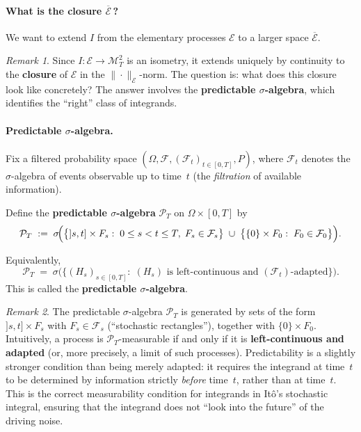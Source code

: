 \documentclass[11pt]{article}
\theoremstyle{definition}
\theoremstyle{remark}
\newtheorem{remark}{Remark}
\begin{document}
\paragraph{What is the closure $\overline{\mathcal{E}}$\,?}

We want to extend $I$ from the elementary processes $\mathcal{E}$ to a larger space $\overline{\mathcal{E}}$.

\begin{remark}
Since $I \colon \mathcal{E} \to \mathcal{M}_T^2$ is an isometry, it extends uniquely by continuity to the \textbf{closure} of $\mathcal{E}$ in the $\|\cdot\|_{\mathcal{E}}$-norm.
The question is: what does this closure look like concretely?
The answer involves the \textbf{predictable $\sigma$-algebra}, which identifies the ``right'' class of integrands.
\end{remark}

\paragraph{Predictable $\sigma$-algebra.}

Fix a filtered probability space $(\Omega,\mathcal{F},(\mathcal{F}_t)_{t\in[0,T]},P)$, where
$\mathcal{F}_t$ denotes the $\sigma$-algebra of events observable up to time~$t$
(the \emph{filtration} of available information).

Define the \textbf{predictable $\sigma$-algebra} $\mathcal{P}_T$ on $\Omega \times [0,T]$ by
\[
    \mathcal{P}_T
    \;:=\;
    \sigma\!\Bigl(
        \bigl\{]s,t] \times F_s :\;
        0 \le s < t \le T,\;
        F_s \in \mathcal{F}_s
        \bigr\}
        \;\cup\;
        \bigl\{
        \{0\} \times F_0 :\;
        F_0 \in \mathcal{F}_0
        \bigr\}
    \Bigr).
\]

Equivalently,
\[
    \mathcal{P}_T
    \;=\;
    \sigma\!\bigl(
        \{(H_s)_{s \in [0,T]} :\;
        (H_s) \text{ is left-continuous and }
        (\mathcal{F}_t)\text{-adapted}
        \}
    \bigr).
\]
This is called the \textbf{predictable $\sigma$-algebra}.

\begin{remark}
The predictable $\sigma$-algebra $\mathcal{P}_T$ is generated by sets of the form $]s,t] \times F_s$ with $F_s \in \mathcal{F}_s$ (``stochastic rectangles''), together with $\{0\} \times F_0$.
Intuitively, a process is $\mathcal{P}_T$-measurable if and only if it is \textbf{left-continuous and adapted} (or, more precisely, a limit of such processes).
Predictability is a slightly stronger condition than being merely adapted: it requires the integrand at time~$t$ to be determined by information strictly \emph{before} time~$t$, rather than at time~$t$.
This is the correct measurability condition for integrands in It\^o's stochastic integral, ensuring that the integrand does not ``look into the future'' of the driving noise.
\end{remark}
\end{document}
